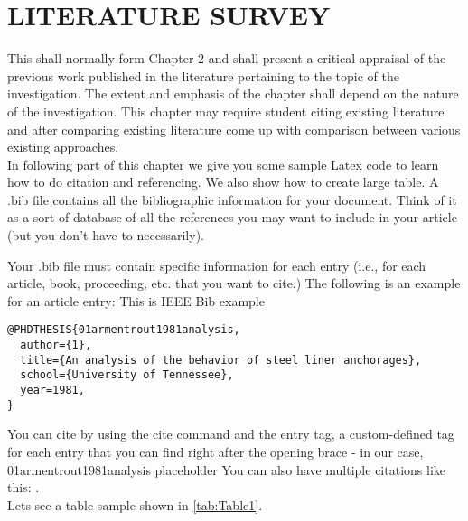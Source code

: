 
\chapter{LITERATURE SURVEY} %

\label{Chapter2} %



This shall normally form Chapter 2 and shall present a critical appraisal of the previous work published in the literature pertaining to the topic of the investigation. The extent and emphasis of the chapter shall depend on the nature of the investigation. This chapter may require student citing existing literature and after comparing existing literature come up with comparison between various existing approaches.\\

In following part of this chapter we give you some sample Latex code to learn how to do citation and referencing. We also show how to create large table. A .bib file contains all the bibliographic information for your document. Think of it as a sort of database of all the references you may want to include in your article (but you don’t have to necessarily).

Your .bib file must contain specific information for each entry (i.e., for each article, book, proceeding, etc. that you want to cite.) The following is an example for an article entry: This is IEEE Bib example \cite{260356}

\begin{lstlisting}
@PHDTHESIS{01armentrout1981analysis,
  author={1},
  title={An analysis of the behavior of steel liner anchorages},
  school={University of Tennessee},
  year=1981,
}
\end{lstlisting}


You can cite by using the cite command and the entry tag, a custom-defined tag for each entry that you can find right after the opening brace  - in our case, 01armentrout1981analysis placeholder \cite{01armentrout1981analysis} You can also have multiple citations like this: \cite{18abaqus, 17bower2011applied, 08schakra}.\\
Lets see a table sample shown in \ref{tab:Table1}.

